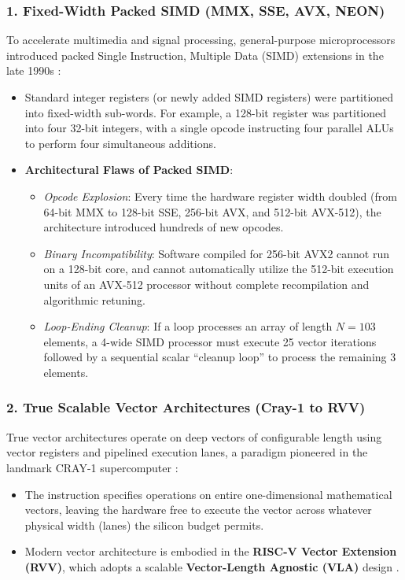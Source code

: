 \subsubsection{1. Fixed-Width Packed SIMD (MMX, SSE, AVX, NEON)}
To accelerate multimedia and signal processing, general-purpose microprocessors introduced packed Single Instruction, Multiple Data (SIMD) extensions in the late 1990s \cite{conte1996simd, firasta2008intel}:
\begin{itemize}
    \item Standard integer registers (or newly added SIMD registers) were partitioned into fixed-width sub-words. For example, a 128-bit register was partitioned into four 32-bit integers, with a single opcode instructing four parallel ALUs to perform four simultaneous additions.
    \item \textbf{Architectural Flaws of Packed SIMD}:
    \begin{itemize}
        \item \emph{Opcode Explosion}: Every time the hardware register width doubled (from 64-bit MMX to 128-bit SSE, 256-bit AVX, and 512-bit AVX-512), the architecture introduced hundreds of new opcodes.
        \item \emph{Binary Incompatibility}: Software compiled for 256-bit AVX2 cannot run on a 128-bit core, and cannot automatically utilize the 512-bit execution units of an AVX-512 processor without complete recompilation and algorithmic retuning.
        \item \emph{Loop-Ending Cleanup}: If a loop processes an array of length $N = 103$ elements, a 4-wide SIMD processor must execute 25 vector iterations followed by a sequential scalar ``cleanup loop'' to process the remaining 3 elements.
    \end{itemize}
\end{itemize}

\subsubsection{2. True Scalable Vector Architectures (Cray-1 to RVV)}
True vector architectures operate on deep vectors of configurable length using vector registers and pipelined execution lanes, a paradigm pioneered in the landmark CRAY-1 supercomputer \cite{cray1978cray1}:
\begin{itemize}
    \item The instruction specifies operations on entire one-dimensional mathematical vectors, leaving the hardware free to execute the vector across whatever physical width (lanes) the silicon budget permits.
    \item Modern vector architecture is embodied in the \textbf{RISC-V Vector Extension (RVV)}, which adopts a scalable \textbf{Vector-Length Agnostic (VLA)} design \cite{riscv-spec}.
\end{itemize}

